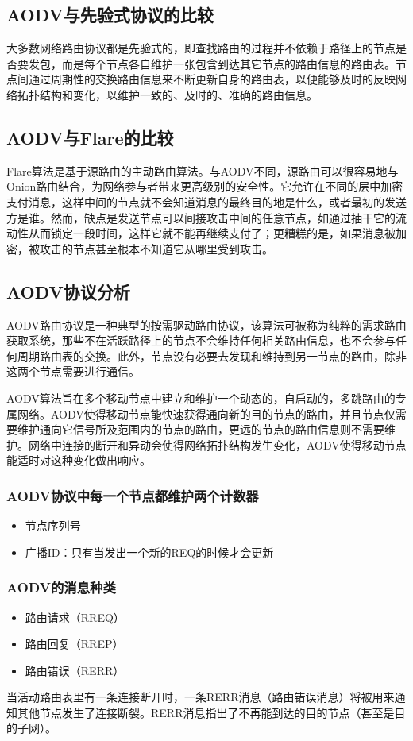 \documentclass[12pt,a4paper]{article}
\begin{document}
\subsection{AODV与先验式协议的比较}
大多数网络路由协议都是先验式的，即查找路由的过程并不依赖于路径上的节点是否要发包，而是每个节点各自维护一张包含到达其它节点的路由信息的路由表。节点间通过周期性的交换路由信息来不断更新自身的路由表，以便能够及时的反映网络拓扑结构和变化，以维护一致的、及时的、准确的路由信息。

\subsection{AODV与Flare的比较}
Flare算法是基于源路由的主动路由算法。与AODV不同，源路由可以很容易地与Onion路由结合，为网络参与者带来更高级别的安全性。它允许在不同的层中加密支付消息，这样中间的节点就不会知道消息的最终目的地是什么，或者最初的发送方是谁。然而，缺点是发送节点可以间接攻击中间的任意节点，如通过抽干它的流动性从而锁定一段时间，这样它就不能再继续支付了；更糟糕的是，如果消息被加密，被攻击的节点甚至根本不知道它从哪里受到攻击。

\subsection{AODV协议分析}
AODV路由协议\cite{cs647_aodv}是一种典型的按需驱动路由协议，该算法可被称为纯粹的需求路由获取系统，那些不在活跃路径上的节点不会维持任何相关路由信息，也不会参与任何周期路由表的交换。此外，节点没有必要去发现和维持到另一节点的路由，除非这两个节点需要进行通信。

AODV算法旨在多个移动节点中建立和维护一个动态的，自启动的，多跳路由的专属网络。AODV使得移动节点能快速获得通向新的目的节点的路由，并且节点仅需要维护通向它信号所及范围内的节点的路由，更远的节点的路由信息则不需要维护。网络中连接的断开和异动会使得网络拓扑结构发生变化，AODV使得移动节点能适时对这种变化做出响应。

\subsubsection{AODV协议中每一个节点都维护两个计数器}
\begin{itemize}
	\item 节点序列号
	\item 广播ID：只有当发出一个新的REQ的时候才会更新
\end{itemize}

\subsubsection{AODV的消息种类}
\begin{itemize}
	\item 路由请求（RREQ）
	\item 路由回复（RREP）
	\item 路由错误（RERR）
\end{itemize}
当活动路由表里有一条连接断开时，一条RERR消息（路由错误消息）将被用来通知其他节点发生了连接断裂。RERR消息指出了不再能到达的目的节点（甚至是目的子网）。
\end{document}
